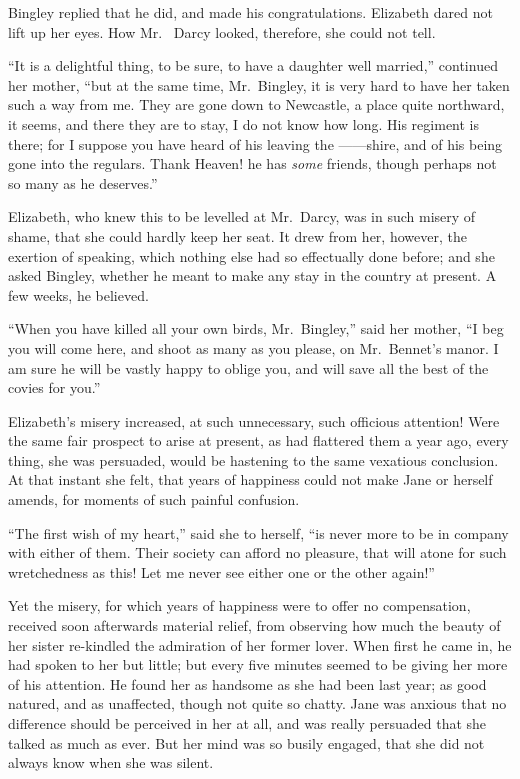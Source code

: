 Bingley replied that he did, and made his congratulations.
Elizabeth dared not lift up her eyes. How Mr.\ %
Darcy looked, therefore, she could not tell.

“It is a delightful thing, to be sure, to have a daughter
well married,” continued her mother, “but at the same
time, Mr.\ Bingley, it is very hard to have her taken such
a way from me. They are gone down to Newcastle, a place
quite northward, it seems, and there they are to stay,
I do not know how long. His regiment is there; for I
suppose you have heard of his leaving the ------shire, and
of his being gone into the regulars. Thank Heaven! he
has \textit{some} friends, though perhaps not so many as he
deserves.”

Elizabeth, who knew this to be levelled at Mr.\ Darcy,
was in such misery of shame, that she could hardly keep
her seat. It drew from her, however, the exertion of
speaking, which nothing else had so effectually done
before; and she asked Bingley, whether he meant to
make any stay in the country at present. A few weeks,
he believed.

“When you have killed all your own birds, Mr.\ Bingley,”
said her mother, “I beg you will come here, and shoot
as many as you please, on Mr.\ Bennet’s manor. I am
sure he will be vastly happy to oblige you, and will save
all the best of the covies for you.”

Elizabeth’s misery increased, at such unnecessary, such
officious attention! Were the same fair prospect to arise
at present, as had flattered them a year ago, every thing,
she was persuaded, would be hastening to the same
vexatious conclusion. At that instant she felt, that years
of happiness could not make Jane or herself amends, for
moments of such painful confusion.

“The first wish of my heart,” said she to herself, “is
never more to be in company with either of them. Their
society can afford no pleasure, that will atone for such
wretchedness as this! Let me never see either one or the
other again!”

Yet the misery, for which years of happiness were to
offer no compensation, received soon afterwards material
relief, from observing how much the beauty of her sister
re-kindled the admiration of her former lover. When
first he came in, he had spoken to her but little; but
every five minutes seemed to be giving her more of his
attention. He found her as handsome as she had been
last year; as good natured, and as unaffected, though
not quite so chatty. Jane was anxious that no difference
should be perceived in her at all, and was really persuaded
that she talked as much as ever. But her mind was so
busily engaged, that she did not always know when she
was silent.

